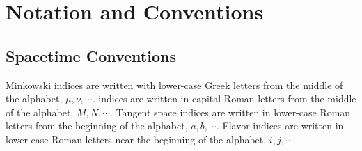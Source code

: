 \documentclass[12pt, oneside]{report}    %
\let\oldsection\section
\def\section{%
  \setcounter{sidenote}{1}%
  \oldsection
}
\begin{document}

\chapter{Notation and Conventions}

\section{Spacetime Conventions}
\label{app:spacetime:conventions}


 Minkowski indices are written with lower-case Greek letters from the middle of the alphabet, $\mu, \nu, \cdots$.  indices are written in capital Roman letters from the middle of the alphabet, $M, N, \cdots$. Tangent space indices are written in lower-case Roman letters from the beginning of the alphabet, $a,b, \cdots$. Flavor indices are written in lower-case Roman letters near the beginning of the alphabet, $i,j,\cdots$.
\end{document}
